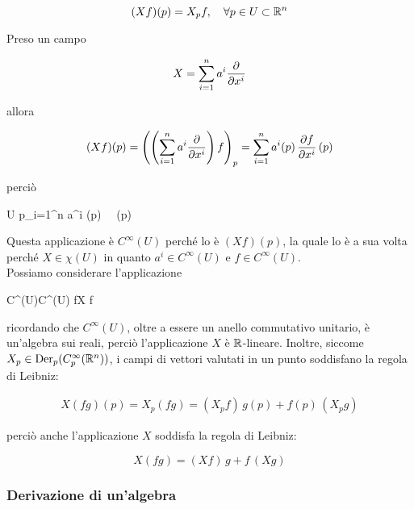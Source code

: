 \begin{equation}
	(X f) (p) = X_{p} f \qcomma \forall p \in U \subset \R^{n}
\end{equation}

Preso un campo

\begin{equation}
	X = \sum_{i=1}^{n} a^{i} \pdv{x^{i}}
\end{equation}

allora

\begin{equation}
	(X f) (p) = \left( \left( \sum_{i=1}^{n} a^{i} \pdv{x^{i}} \right) f \right)_{p} = \sum_{i=1}^{n} a^{i} (p) \, \pdv{f}{x^{i}} \, (p)
\end{equation}

perciò

	{U}{\R}
	{p}{\sum_{i=1}^{n} a^{i} (p) \,  \, (p)}

Questa applicazione è $ C^{\infty}(U) $ perché lo è $ (X f) (p) $, la quale lo è a sua volta perché $ X \in \chi(U) $ in quanto $ a^{i} \in C^{\infty}(U) $ e $ f \in C^{\infty}(U) $. \\
Possiamo considerare l'applicazione


	{C^{\infty}(U)}{C^{\infty}(U)}
	{f}{X f}

ricordando che $ C^{\infty}(U) $, oltre a essere un anello commutativo unitario, è un'algebra sui reali, perciò l'applicazione $ X $ è $ \mathbb{R} $-lineare. Inoltre, siccome $ X_{p} \in \operatorname{Der}_{p}(C_{p}^{\infty}(\mathbb{R}^{n})) $, i campi di vettori valutati in un punto soddisfano la regola di Leibniz:

\begin{align}
	X (f g) (p) = X_{p} (f g) = (X_{p} f) \, g(p) + f(p) \, (X_{p} g)
\end{align}

perciò anche l'applicazione $ X $ soddisfa la regola di Leibniz:

\begin{equation}
	X (f g) = (X f) \, g + f \, (X g)
\end{equation}

\subsubsection{Derivazione di un'algebra}

